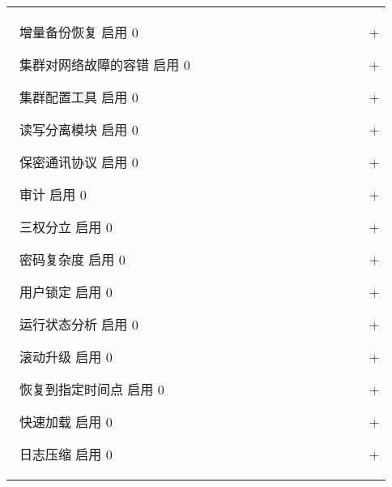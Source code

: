 \documentclass[letterpaper,10pt,english]{sphinxmanual}
\begin{document}
\begin{savenotes}
\begin{tabulary}{\linewidth}[t]{|T|}
 增量备份恢复 \sphinxhyphen{}\sphinxhyphen{}\sphinxhyphen{} 启用 \sphinxhyphen{}\sphinxhyphen{}\sphinxhyphen{} 0                                    +

 集群对网络故障的容错 \sphinxhyphen{}\sphinxhyphen{}\sphinxhyphen{} 启用 \sphinxhyphen{}\sphinxhyphen{}\sphinxhyphen{} 0                            +

 集群配置工具 \sphinxhyphen{}\sphinxhyphen{}\sphinxhyphen{} 启用 \sphinxhyphen{}\sphinxhyphen{}\sphinxhyphen{} 0                                    +

 读写分离模块 \sphinxhyphen{}\sphinxhyphen{}\sphinxhyphen{} 启用 \sphinxhyphen{}\sphinxhyphen{}\sphinxhyphen{} 0                                    +

 保密通讯协议 \sphinxhyphen{}\sphinxhyphen{}\sphinxhyphen{} 启用 \sphinxhyphen{}\sphinxhyphen{}\sphinxhyphen{} 0                                    +

 审计 \sphinxhyphen{}\sphinxhyphen{}\sphinxhyphen{} 启用 \sphinxhyphen{}\sphinxhyphen{}\sphinxhyphen{} 0                                            +

 三权分立 \sphinxhyphen{}\sphinxhyphen{}\sphinxhyphen{} 启用 \sphinxhyphen{}\sphinxhyphen{}\sphinxhyphen{} 0                                        +

 密码复杂度 \sphinxhyphen{}\sphinxhyphen{}\sphinxhyphen{} 启用 \sphinxhyphen{}\sphinxhyphen{}\sphinxhyphen{} 0                                      +

 用户锁定 \sphinxhyphen{}\sphinxhyphen{}\sphinxhyphen{} 启用 \sphinxhyphen{}\sphinxhyphen{}\sphinxhyphen{} 0                                        +

 运行状态分析 \sphinxhyphen{}\sphinxhyphen{}\sphinxhyphen{} 启用 \sphinxhyphen{}\sphinxhyphen{}\sphinxhyphen{} 0                                    +

 滚动升级 \sphinxhyphen{}\sphinxhyphen{}\sphinxhyphen{} 启用 \sphinxhyphen{}\sphinxhyphen{}\sphinxhyphen{} 0                                        +

 恢复到指定时间点 \sphinxhyphen{}\sphinxhyphen{}\sphinxhyphen{} 启用 \sphinxhyphen{}\sphinxhyphen{}\sphinxhyphen{} 0                                +

 快速加载 \sphinxhyphen{}\sphinxhyphen{}\sphinxhyphen{} 启用 \sphinxhyphen{}\sphinxhyphen{}\sphinxhyphen{} 0                                        +

 日志压缩 \sphinxhyphen{}\sphinxhyphen{}\sphinxhyphen{} 启用 \sphinxhyphen{}\sphinxhyphen{}\sphinxhyphen{} 0                                        +


\end{tabulary}
\end{savenotes}
\end{document}
